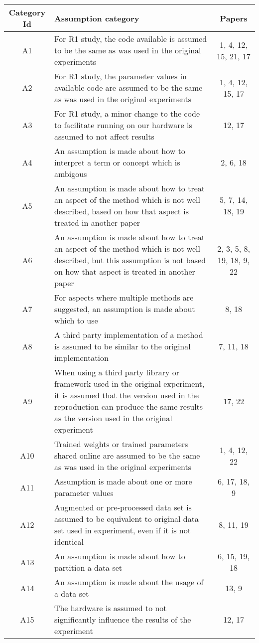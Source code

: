 \begin{tabularx}{\textwidth}{cXc}
\toprule
Category Id &                                                                                                                                                                                                 Assumption category &                     Papers \\
\midrule
 A1 &  For R1 study, the code available is assumed to be the same as was used in the original experiments &  1, 4, 12, 15, 21, 17 \\
 A2 &  For R1 study, the parameter values in available code are assumed to be the same as was used in the original experiments &  1, 4, 12, 15, 17 \\
 A3 &  For R1 study, a minor change to the code to facilitate running on our hardware is assumed to not affect results &  12, 17 \\
 A4 &  An assumption is made about how to interpret a term or concept which is ambigous &  2, 6, 18 \\
 A5 &  An assumption is made about how to treat an aspect of the method which is not well described, based on how that aspect is treated in another paper &  5, 7, 14, 18, 19 \\
 A6 &  An assumption is made about how to treat an aspect of the method which is not well described, but this assumption is not based on how that aspect is treated in another paper &  2, 3, 5, 8, 19, 18, 9, 22 \\
 A7 &  For aspects where multiple methods are suggested, an assumption is made about which to use &  8, 18 \\
 A8 &  A third party implementation of a method is assumed to be similar to the original implementation &  7, 11, 18 \\
 A9 &  When using a third party library or framework used in the original experiment, it is assumed that the version used in the reproduction can produce the same results as the version used in the original experiment &  17, 22 \\
 A10 &  Trained weights or trained parameters shared online are assumed to be the same as was used in the original experiments &  1, 4, 12, 22 \\
 A11 &  Assumption is made about one or more parameter values &  6, 17, 18, 9 \\
 A12 &  Augmented or pre-processed data set is assumed to be equivalent to original data set used in experiment, even if it is not identical &  8, 11, 19 \\
 A13 &  An assumption is made about how to partition a data set  &  6, 15, 19, 18 \\
 A14 &  An assumption is made about the usage of a data set &  13, 9 \\
 A15 &  The hardware is assumed to not significantly influence the results of the experiment &  12, 17 \\
\bottomrule
\end{tabularx}
